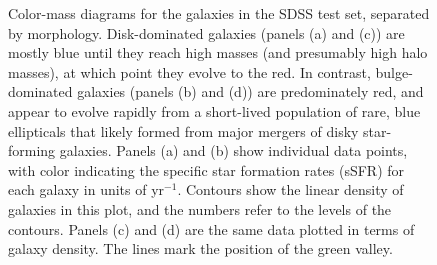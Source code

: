 \begin{figure}[htbp]
\begin{center}
\begin{tabular}{ll}
    \end{tabular}
  \end{center}
  \caption{Color-mass diagrams for the galaxies in the SDSS test set, separated by morphology. Disk-dominated galaxies (panels (a) and (c)) are mostly blue until they reach high masses (and presumably high halo masses), at which point they evolve to the red. In contrast, bulge-dominated galaxies (panels (b) and (d)) are predominately red, and appear to evolve rapidly from a short-lived population of rare, blue ellipticals that likely formed from major mergers of disky star-forming galaxies. Panels (a) and (b) show individual data points, with color indicating the specific star formation rates (sSFR) for each galaxy in units of yr$^{-1}$. Contours show the linear density of galaxies in this plot, and the numbers refer to the levels of the contours. Panels (c) and (d) are the same data plotted in terms of galaxy density. The lines mark the position of the green valley.}
  \label{fig:sdss_cmd}
\end{figure}


